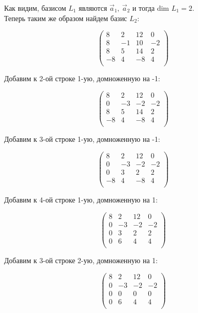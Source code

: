 	Как видим, базисом $L_1$ являются $\vec a_1,\ \vec a_2$ и тогда dim $L_1 = 2$. \\
	
	Теперь таким же образом найдем базис $L_2$:
	
	\[
	\begin{pmatrix}
	8 & 2 & 12 & 0 \\
	8 & -1 & 10 & -2 \\
	8 & 5 & 14 & 2 \\
	-8 & 4 & -8 & 4 \\
	\end{pmatrix}
	\]
	
	Добавим к 2-ой строке 1-ую, домноженную на -1:
	
	\[
	\begin{pmatrix}
	8 & 2 & 12 & 0 \\
	0 & -3 & -2 & -2 \\
	8 & 5 & 14 & 2 \\
	-8 & 4 & -8 & 4 \\
	\end{pmatrix}
	\]
	
	Добавим к 3-ой строке 1-ую, домноженную на -1:
	
	\[
	\begin{pmatrix}
	8 & 2 & 12 & 0 \\
	0 & -3 & -2 & -2 \\
	0 & 3 & 2 & 2 \\
	-8 & 4 & -8 & 4 \\
	\end{pmatrix}
	\]
	
	Добавим к 4-ой строке 1-ую, домноженную на 1:
	
	\[
	\begin{pmatrix}
	8 & 2 & 12 & 0 \\
	0 & -3 & -2 & -2 \\
	0 & 3 & 2 & 2 \\
	0 & 6 & 4 & 4 \\
	\end{pmatrix}
	\]
	
	Добавим к 3-ой строке 2-ую, домноженную на 1:
	
	\[
	\begin{pmatrix}
	8 & 2 & 12 & 0 \\
	0 & -3 & -2 & -2 \\
	0 & 0 & 0 & 0 \\
	0 & 6 & 4 & 4 \\
	\end{pmatrix}
	\]
	

